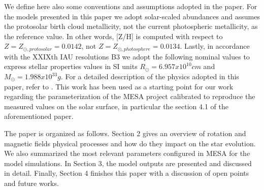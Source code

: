 \documentclass[fleqn,usenatbib]{mnras}
\begin{document}
We define here also some conventions and assumptions adopted in the paper. For the models presented in this paper we adopt solar-scaled abundances and assumes the \citet{Asplund2009} protosolar birth cloud metallicity, not the current photospheric metallicity, as the reference value. In other words, [Z/H] is computed with respect to $Z = Z_{\odot, protosolar} = 0.0142$, not $Z = Z_{\odot, photosphere} = 0.0134$. Lastly, in accordance with the XXIXth IAU resolutions B3 \citep{Mamajek2015} we adopt the following nominal values to express stellar properties values in SI units $R_{\odot} = 6.957x10^{10} cm$ and $M_{\odot} = 1.988x10^{33} g$. For a detailed description of the physics adopted in this paper, refer to \citet{Choi2016}. This work has been used as a starting point for our work regarding the parameterization of the MESA project calibrated to reproduce the measured values on the solar surface, in particular the section 4.1 of the aforementioned paper.\par

The paper is organized as follows. Section 2 gives an overview of rotation and magnetic fields physical processes and how do they impact on the star evolution. We also summarized the most relevant parameters configured in MESA for the model simulations. In Section 3, the model outputs are presented and discussed in detail. Finally, Section 4 finishes this paper with a discussion of open points and future works.\par
\end{document}
